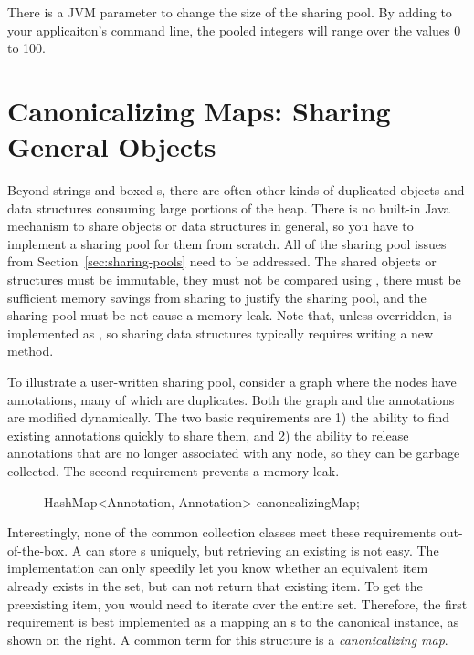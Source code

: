 There is a JVM parameter to change the size of the  sharing pool.
By adding  to your applicaiton's command line, the
pooled integers will range over the values 0 to 100.

\section{Canonicalizing Maps: Sharing General Objects}
\label{sec:canonicalizing-maps}

Beyond strings and boxed s, there are often other kinds of
duplicated objects and data structures consuming large portions of the heap. 
There is no built-in Java mechanism to share objects or data
structures in general, so you have to implement a sharing pool for them from
scratch. All of the sharing pool issues from Section~\ref{sec:sharing-pools} need to be
addressed. The shared objects or structures must be immutable, they must not be
compared using \code{==}, there must be sufficient memory savings from sharing
to justify the sharing pool, and the sharing pool must be not cause a memory leak. 
Note that, unless overridden,  is
implemented as \code{==}, so sharing data structures typically requires writing
a new  method.

To illustrate a user-written sharing pool, consider a graph where the nodes
have annotations, many of which are duplicates. Both the graph and the
annotations are modified dynamically. The two basic requirements are 1) the
ability to find existing annotations quickly to share them, and 2) the ability
to release annotations that are no longer associated with any node, so they can
be garbage collected.  The second requirement prevents a memory leak. 

\begin{figure}
\centering
\begin{framedlisting}
HashMap<Annotation, Annotation> canoncalizingMap;
\end{framedlisting}
\end{figure}
Interestingly, none of the common collection classes meet these requirements
out-of-the-box. A  can store s uniquely, but
retrieving an existing  is not easy. The 
implementation can only speedily let you know whether an equivalent item already
exists in the set, but can not return that existing item. To get the preexisting
item, you would need to iterate over the entire set. Therefore, the first
requirement is best implemented as a  mapping an
s to the canonical instance, as shown on the right. A common
term for this structure is a \emph{canonicalizing map}.

